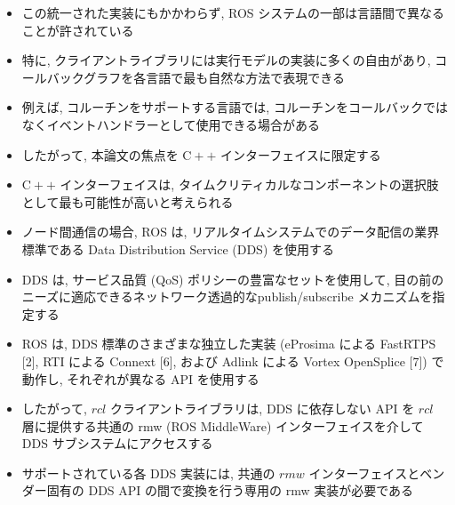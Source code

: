 \begin{frame}{}
    \begin{itemize}
        \item この統一された実装にもかかわらず, ROS システムの一部は言語間で異なることが許されている
        \item 特に, クライアントライブラリには実行モデルの実装に多くの自由があり, コールバックグラフを各言語で最も自然な方法で表現できる
        \item 例えば, コルーチンをサポートする言語では, コルーチンをコールバックではなくイベントハンドラーとして使用できる場合がある
        \item したがって, 本論文の焦点を $\mathrm{C}++$ インターフェイスに限定する
        \item $\mathrm{C}++$ インターフェイスは, タイムクリティカルなコンポーネントの選択肢として最も可能性が高いと考えられる
    \end{itemize}
\end{frame}

\begin{frame}{}
    \begin{itemize}
        \item ノード間通信の場合, ROS は, リアルタイムシステムでのデータ配信の業界標準である Data Distribution Service (DDS) を使用する
        \item DDS は, サービス品質 (QoS) ポリシーの豊富なセットを使用して, 目の前のニーズに適応できるネットワーク透過的なpublish/subscribe メカニズムを指定する
    \end{itemize}
\end{frame}

\begin{frame}{}
    \begin{itemize}
        \item ROS は, DDS 標準のさまざまな独立した実装 (eProsima による FastRTPS [2], RTI による Connext [6], および Adlink による Vortex OpenSplice [7]) で動作し, それぞれが異なる API を使用する
        \item したがって, $r c l$ クライアントライブラリは, DDS に依存しない API を $r c l$ 層に提供する共通の rmw (ROS MiddleWare) インターフェイスを介して DDS サブシステムにアクセスする
        \item サポートされている各 DDS 実装には, 共通の $r m w$ インターフェイスとベンダー固有の DDS API の間で変換を行う専用の rmw 実装が必要である
    \end{itemize}
\end{frame}

